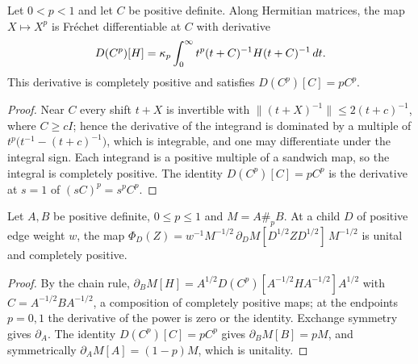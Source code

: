 \begin{lemma}\label{lem:rpow_frechet_derivative}
    \leanok
    Let $0<p<1$ and let $C$ be positive definite. Along Hermitian matrices, the
    map $X\mapsto X^p$ is Fr\'echet differentiable at $C$ with derivative
    \begin{align}
        D(C^p)[H]=\kappa_p\int_0^\infty t^p(t+C)^{-1}H(t+C)^{-1}\,dt.
        \notag
    \end{align}
    This derivative is completely positive and satisfies $D(C^p)[C]=pC^p$.
\end{lemma}

\begin{proof}\leanok
    Near $C$ every shift $t+X$ is invertible with
    $\|(t+X)^{-1}\|\le2(t+c)^{-1}$, where $C\ge cI$; hence the derivative of
    the integrand is dominated by a multiple of
    $t^p\bigl(t^{-1}-(t+c)^{-1}\bigr)$, which is integrable, and one may
    differentiate under the integral sign. Each integrand is a positive multiple
    of a sandwich map, so the integral is completely positive. The identity
    $D(C^p)[C]=pC^p$ is the derivative at $s=1$ of $(sC)^p=s^pC^p$.
\end{proof}

\begin{lemma}\label{lem:mean_vertex_derivative_maps}
    \leanok
    Let $A,B$ be positive definite, $0\le p\le1$ and $M=A\#_pB$. At a child $D$
    of positive edge weight $w$, the map
    $\Phi_D(Z)=w^{-1}M^{-1/2}\,\partial_DM[D^{1/2}ZD^{1/2}]\,M^{-1/2}$ is unital
    and completely positive.
\end{lemma}

\begin{proof}\leanok
    By the chain rule,
    $\partial_BM[H]=A^{1/2}D(C^p)[A^{-1/2}HA^{-1/2}]A^{1/2}$ with
    $C=A^{-1/2}BA^{-1/2}$, a composition of completely positive maps; at the
    endpoints $p=0,1$ the derivative of the power is zero or the identity.
    Exchange symmetry gives $\partial_A$. The identity $D(C^p)[C]=pC^p$ gives
    $\partial_BM[B]=pM$, and symmetrically $\partial_AM[A]=(1-p)M$, which is
    unitality.
\end{proof}

